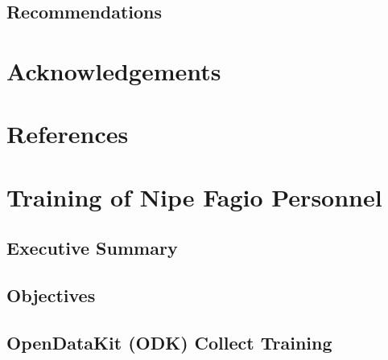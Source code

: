 \documentclass[a4paper,12pt,twoside]{article}
\begin{document}
\begin{multicols}{2}
\lipsum[0-5]
\end{multicols}
\subsection{Recommendations}

\begin{multicols}{2}
\lipsum[0-5]
\end{multicols}

\section{Acknowledgements}

\begin{multicols}{2}
\lipsum[0-5]
\end{multicols}

\section{References}

\begin{multicols}{2}
\lipsum[0-5]
\end{multicols}

\section{Training of Nipe Fagio Personnel}

\begin{multicols}{2}
\lipsum[0-5]
\end{multicols}

\subsection{Executive Summary}

\begin{multicols}{2}
\lipsum[0-5]
\end{multicols}

\subsection{Objectives}

\begin{multicols}{2}
\lipsum[0-5]
\end{multicols}

\subsection{OpenDataKit (ODK) Collect Training}
\end{document}
